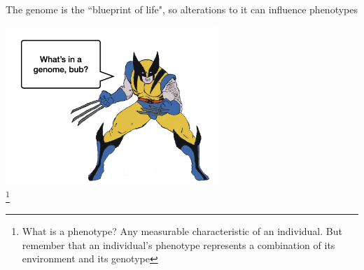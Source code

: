 \documentclass{beamer}
\newcommand\blfootnote[1]{%
	\begingroup
	\renewcommand\thefootnote{}\footnote{#1}%
	\addtocounter{footnote}{-1}%
	\endgroup
}
\begin{document}
\begin{frame}

	
	
			The genome is the ``blueprint of life", so alterations to it can influence phenotypes\\
			
\vspace{15pt}			
		
			\centering	\includegraphics[keepaspectratio, width  = 0.6\textwidth]{img/logantalking}\\
	
\blfootnote{What is a phenotype? Any measurable characteristic of an individual. But remember that an individual's phenotype represents a combination of its environment and its genotype}
\end{frame}
\end{document}
